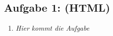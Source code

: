 \subsection{Aufgabe 1: (HTML)}
\label{sec:Aufgabe1}
\begin{enumerate}[label=\alph*)]
    \item \textit{Hier kommt die Aufgabe}
\end{enumerate}